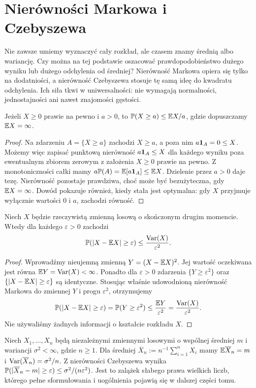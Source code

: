 \section{Nierówności Markowa i Czebyszewa}
Nie zawsze umiemy wyznaczyć cały rozkład, ale czasem znamy
średnią albo wariancję. Czy można na tej podstawie oszacować
prawdopodobieństwo dużego wyniku lub dużego odchylenia od średniej?
Nierówność Markowa opiera się tylko na dodatniości, a nierówność
Czebyszewa stosuje tę samą ideę do kwadratu odchylenia.
Ich siła tkwi w uniwersalności: nie wymagają normalności,
jednostajności ani nawet znajomości gęstości.

\begin{twierdzenie}
Jeżeli $X\geq0$ prawie na pewno i $a>0$, to
$\mathbb{P}(X\geq a)\leq\mathbb{E} X/a$, gdzie dopuszczamy $\mathbb{E} X=\infty$.
\end{twierdzenie}
\begin{proof}
Na zdarzeniu $A=\{X\geq a\}$ zachodzi $X\geq a$,
a poza nim $a\mathbf{1}_{A}=0\leq X$.
Możemy więc zapisać punktową nierówność
$a\mathbf{1}_{A}\leq X$ dla każdego wyniku poza ewentualnym
zbiorem zerowym z założenia $X\geq0$ prawie na pewno.
Z monotoniczności całki mamy
$a\mathbb{P}(A)=\mathbb{E}[a\mathbf{1}_{A}]\leq\mathbb{E} X$.
Dzielenie przez $a>0$ daje tezę. Nierówność pozostaje
prawdziwa, choć może być bezużyteczna, gdy $\mathbb{E} X=\infty$.
Dowód pokazuje również, kiedy stała jest optymalna:
gdy $X$ przyjmuje wyłącznie wartości $0$ i $a$,
zachodzi równość.
\end{proof}

\begin{twierdzenie}
Niech $X$ będzie rzeczywistą zmienną losową o skończonym
drugim momencie. Wtedy dla każdego $\varepsilon>0$ zachodzi
\[
\mathbb{P}(|X-\mathbb{E} X|\geq\varepsilon)
\leq\frac{\operatorname{Var}(X)}{\varepsilon^2}.
\]
\end{twierdzenie}
\begin{proof}
Wprowadźmy nieujemną zmienną
$Y=(X-\mathbb{E} X)^2$. Jej wartość oczekiwana jest równa
$\mathbb{E} Y=\operatorname{Var}(X)<\infty$. Ponadto dla $\varepsilon>0$
zdarzenia
$\{Y\geq\varepsilon^2\}$ oraz
$\{|X-\mathbb{E} X|\geq\varepsilon\}$ są identyczne.
Stosując właśnie udowodnioną nierówność Markowa
do zmiennej $Y$ i progu $\varepsilon^2$, otrzymujemy
\[
\mathbb{P}(|X-\mathbb{E} X|\geq\varepsilon)
=\mathbb{P}(Y\geq\varepsilon^2)
\leq\frac{\mathbb{E} Y}{\varepsilon^2}
=\frac{\operatorname{Var}(X)}{\varepsilon^2}.
\]
Nie używaliśmy żadnych informacji o kształcie rozkładu $X$.
\end{proof}

\begin{przyklad}
Niech $X_1,\ldots,X_n$ będą niezależnymi zmiennymi losowymi
o wspólnej średniej $m$ i wariancji $\sigma^2<\infty$,
gdzie $n\geq1$. Dla średniej $\overline X_n:=n^{-1}\sum_{i=1}^nX_i$
mamy $\mathbb{E}\overline X_n=m$ i $\operatorname{Var}(\overline X_n)=\sigma^2/n$.
Z nierówności Czebyszewa wynika
$\mathbb{P}(|\overline X_n-m|\geq\varepsilon)
\leq\sigma^2/(n\varepsilon^2)$.
Jest to zalążek słabego prawa wielkich liczb, którego
pełne sformułowania i uogólnienia pojawią się w dalszej części tomu.
\end{przyklad}


